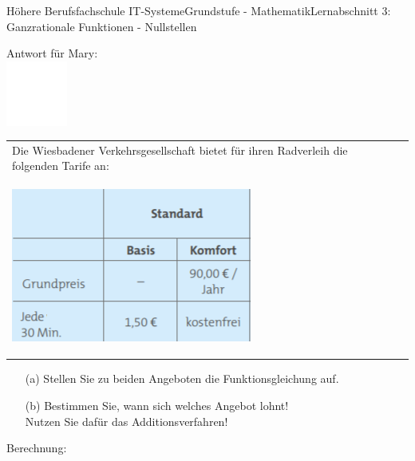 \documentclass[oneside,openany,headings=optiontotoc,11pt,numbers=noenddot]{scrreprt}
\begin{document}
\begin{worksheet}{Höhere Berufsfachschule IT-Systeme}{Grundstufe - Mathematik}{Lernabschnitt 3: Ganzrationale Funktionen - Nullstellen}
\begin{framed}
		\end{framed}
		\begin{framed}
			\noindent
			\small{\color{codegray}Antwort für Mary:}\\
			\includegraphics[width=0.15\textwidth]{../../empty.jpg}\\
		\end{framed}
		\normalsize
		\newpage
		\begin{framed}
			\noindent
			\begin{tabularx}{\textwidth}{Xr}
				Die Wiesbadener Verkehrsgesellschaft bietet für ihren Radverleih die folgenden Tarife an:\\
				\begin{centering}
					\includegraphics{../99_Bilder/eswe.png}
				\end{centering}
			\end{tabularx}
			\begin{itemize}
				\item[(a)] Stellen Sie zu beiden Angeboten die Funktionsgleichung auf.
				\item[(b)] Bestimmen Sie, wann sich welches Angebot lohnt!\\
				\small{Nutzen Sie dafür das Additionsverfahren!}
			\end{itemize}
		\end{framed}
		\begin{framed}
			\noindent
			\small{\color{codegray}Berechnung:}\\

\end{framed}
\end{worksheet}
\end{document}
